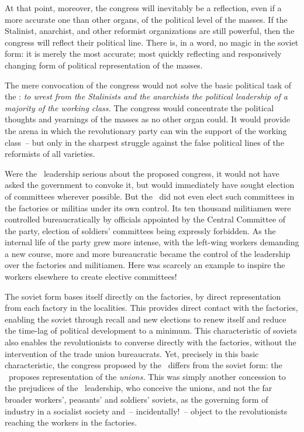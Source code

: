 At that point, moreover, the congress will inevitably be a reflection, even if a more accurate one than other organs, of the political level of the masses. If the Stalinist, anarchist, and other reformist organizations are still powerful, then the congress will reflect their political line. There is, in a word, no magic in the soviet form: it is merely the most accurate; most quickly reflecting and responsively changing form of political representation of the masses.

The mere convocation of the congress would not solve the basic political task of the \POUM: \emph{to wrest from the Stalinists and the anarchists the political leadership of a majority of the working class.} The congress would concentrate the political thoughts and yearnings of the masses as no other organ could. It would provide the arena in which the revolutionary party can win the support of the working class~-- but only in the sharpest struggle against the false political lines of the reformists of all varieties.

Were the \POUM\ leadership serious about the proposed congress, it would not have asked the government to convoke it, but would immediately have sought election of committees wherever possible. But the \POUM\ did not even elect such committees in the factories or militias under its own control. Its ten thousand militiamen were controlled bureaucratically by officials appointed by the Central Committee of the party, election of soldiers’ committees being expressly forbidden. As the internal life of the party grew more intense, with the left-wing workers demanding a new course, more and more bureaucratic became the control of the leadership over the factories and militiamen. Here was scarcely an example to inspire the workers elsewhere to create elective committees!

The soviet form bases itself directly on the factories, by direct representation from each factory in the localities. This provides direct contact with the factories, enabling the soviet through recall and new elections to renew itself and reduce the time-lag of political development to a minimum. This characteristic of soviets also enables the revolutionists to converse directly with the factories, without the intervention of the trade union bureaucrats. Yet, precisely in this basic characteristic, the congress proposed by the \POUM\ differs from the soviet form: the \POUM\ proposes representation of the \emph{unions.} This was simply another concession to the prejudices of the \CNT\ leadership, who conceive the unions, and not the far broader workers’\kn\kn, peasants’ and soldiers’ soviets, as the governing form of industry in a socialist society and~-- incidentally!~-- object to the revolutionists reaching the workers in the factories.

